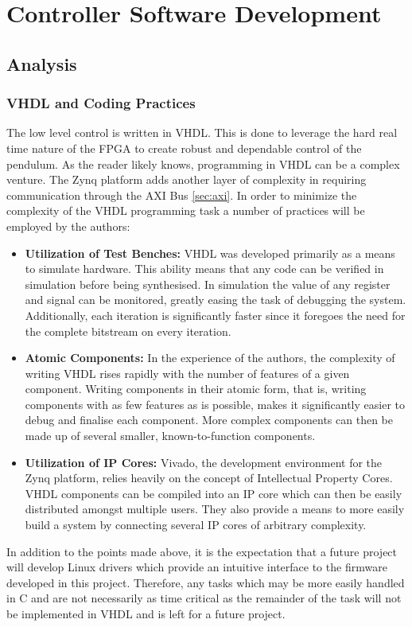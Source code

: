 \section{Controller Software Development} %
\label{sub:controller_board_software}

\subsection{Analysis} %
\label{sub:analysis}
\subsubsection{VHDL and Coding Practices} %
\label{ssub:vhdl_and_coding_practices}
The low level control is written in VHDL.
This is done to leverage the hard real time nature of the FPGA to create robust and dependable control of the pendulum.
As the reader likely knows, programming in VHDL can be a complex venture.
The Zynq platform adds another layer of complexity in requiring communication through the AXI Bus \ref{sec:axi}.
In order to minimize the complexity of the VHDL programming task a number of practices will be employed by the authors:
\begin{itemize}
	\item \textbf{Utilization of Test Benches:} VHDL was developed primarily as a means to simulate hardware.
	This ability means that any code can be verified in simulation before being synthesised.
	In simulation the value of any register and signal can be monitored, greatly easing the task of debugging the system.
	Additionally, each iteration is significantly faster since it foregoes the need for the complete bitstream on every iteration.
	\item \textbf{Atomic Components:} In the experience of the authors, the complexity of writing VHDL rises rapidly with the number of features of a given component.
	Writing components in their atomic form, that is, writing components with as few features as is possible, makes it significantly easier to debug and finalise each component.
	More complex components can then be made up of several smaller, known-to-function components.
	\item \textbf{Utilization of IP Cores:} Vivado, the development environment for the Zynq platform, relies heavily on the concept of Intellectual Property Cores.
	VHDL components can be compiled into an IP core which can then be easily distributed amongst multiple users.
	They also provide a means to more easily build a system by connecting several IP cores of arbitrary complexity.
\end{itemize}
In addition to the points made above, it is the expectation that a future project will develop Linux drivers which provide an intuitive interface to the firmware developed in this project.
Therefore, any tasks which may be more easily handled in C and are not necessarily as time critical as the remainder of the task will not be implemented in VHDL and is left for a future project.
